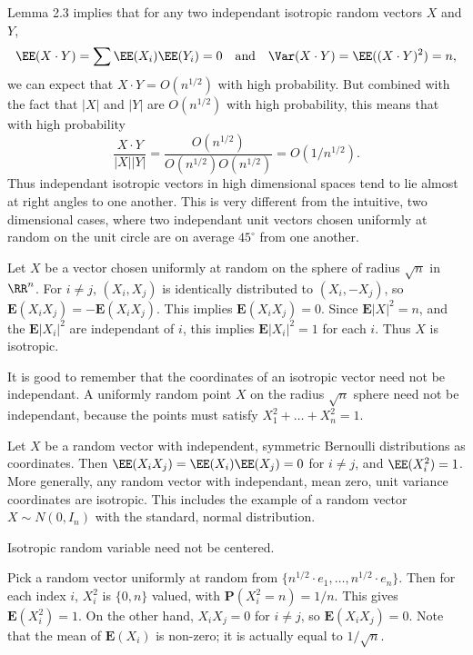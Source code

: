 \begin{remark}
	Lemma 2.3 implies that for any two independant isotropic random vectors $X$ and $Y$,
    \[ \EE(X \cdot Y) = \sum \EE(X_i) \EE(Y_i) = 0\quad\text{and}\quad \Var(X \cdot Y) = \EE((X \cdot Y)^2) = n, \]
    we can expect that $X \cdot Y = O(n^{1/2})$ with high probability. But combined with the fact that $|X|$ and $|Y|$ are $O(n^{1/2})$ with high probability, this means that with high probability
    \[ \frac{X \cdot Y}{|X| |Y|} = \frac{O(n^{1/2})}{O(n^{1/2}) O(n^{1/2})} = O \left(1/n^{1/2} \right). \]
    Thus independant isotropic vectors in high dimensional spaces tend to lie almost at right angles to one another. This is very different from the intuitive, two dimensional cases, where two independant unit vectors chosen uniformly at random on the unit circle are on average $45^\circ$ from one another.
\end{remark}

\begin{example}
    Let $X$ be a vector chosen uniformly at random on the sphere of radius $\sqrt{n}$ in $\RR^n$. For $i \neq j$, $(X_i,X_j)$ is identically distributed to $(X_i,-X_j)$, so $\mathbf{E}(X_iX_j) = - \mathbf{E}(X_iX_j)$. This implies $\mathbf{E}(X_iX_j) = 0$. Since $\mathbf{E} |X|^2 = n$, and the $\mathbf{E} |X_i|^2$ are independant of $i$, this implies $\mathbf{E} |X_i|^2 = 1$ for each $i$. Thus $X$ is isotropic.
\end{example}

It is good to remember that the coordinates of an isotropic vector need not be independant. A uniformly random point $X$ on the radius $\sqrt{n}$ sphere need not be independant, because the points must satisfy $X_1^2 + \dots + X_n^2 = 1$.

\begin{example}
    Let $X$ be a random vector with independent, symmetric Bernoulli distributions as coordinates. Then $\EE(X_iX_j) = \EE(X_i) \EE(X_j) = 0$ for $i \neq j$, and $\EE(X_i^2) = 1$. More generally, any random vector with independant, mean zero, unit variance coordinates are isotropic. This includes the example of a random vector $X \sim N(0,I_n)$ with the standard, normal distribution.
\end{example}

Isotropic random variable need not be centered.

\begin{example}
    Pick a random vector uniformly at random from $\{ n^{1/2} \cdot e_1, \dots, n^{1/2} \cdot e_n \}$. Then for each index $i$, $X_i^2$ is $\{ 0,n \}$ valued, with $\mathbf{P}(X_i^2 = n) = 1/n$. This gives $\mathbf{E}(X_i^2) = 1$. On the other hand, $X_iX_j = 0$ for $i \neq j$, so $\mathbf{E}(X_iX_j) = 0$. Note that the mean of $\mathbf{E}(X_i)$ is non-zero; it is actually equal to $1/\sqrt{n}$.
\end{example}

